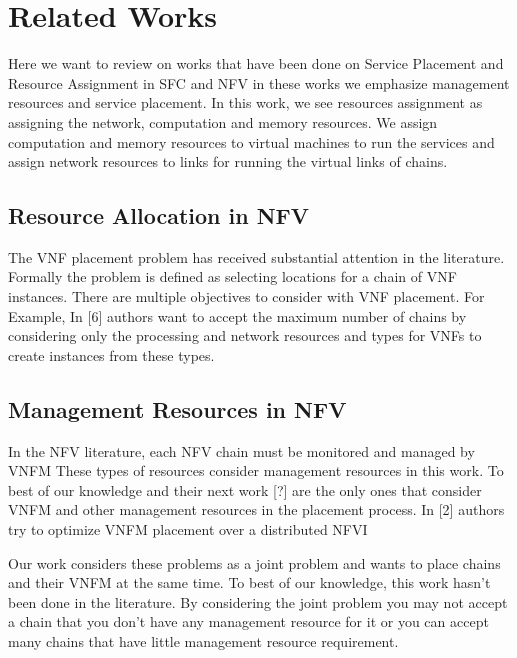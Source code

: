 \section{Related Works}

Here we want to review on works that have been done on Service Placement and Resource Assignment
in SFC and NFV in these works we emphasize management resources and service placement.
In this work, we see resources assignment as assigning the network, computation and memory resources.
We assign computation and memory resources to virtual machines to run the services and assign network resources to links for running the virtual links of chains.

\subsection{Resource Allocation in NFV}
The VNF placement problem has received substantial attention in the literature.
Formally the problem is defined as selecting locations for a chain of VNF instances.
There are multiple objectives to consider with VNF placement.
For Example, In [6] authors want to accept the maximum number of chains by considering only the processing and network resources and types for VNFs to create instances from these types.

\subsection{Management Resources in NFV}
In the NFV literature, each NFV chain must be monitored and managed by VNFM
These types of resources consider management resources in this work.
To best of our knowledge \cite{AbuLebdeh2017} and their next work [?] are the only ones that consider VNFM and other management resources in the placement process.
In [2] authors try to optimize VNFM placement over a distributed NFVI

Our work considers these problems as a joint problem and wants to place chains and their VNFM at the same time. To best of our knowledge, this work hasn't been done in the literature. By considering the joint problem you may not accept a chain that you don't have any management resource for it or you can accept many chains that have little management resource requirement.
